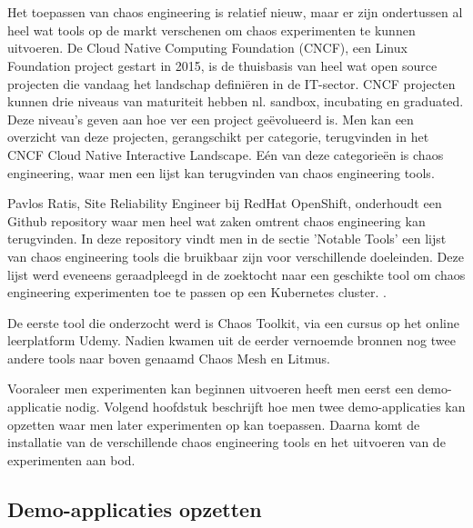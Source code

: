 
\chapter{}
\label{ch:chaostools}

Het toepassen van chaos engineering is relatief nieuw, maar er zijn ondertussen al heel wat tools op de markt verschenen om chaos experimenten te kunnen uitvoeren. De Cloud Native Computing Foundation (CNCF), een Linux Foundation project gestart in 2015, is de thuisbasis van heel wat open source projecten die vandaag het landschap definiëren in de IT-sector. CNCF projecten kunnen drie niveaus van maturiteit hebben nl. sandbox, incubating en graduated. Deze niveau's geven aan hoe ver een project geëvolueerd is. \autocite{CNCF2022a}
\newline Men kan een overzicht van deze projecten, gerangschikt per categorie, terugvinden in het CNCF Cloud Native Interactive Landscape. Eén van deze categorieën is chaos engineering, waar men  een lijst kan terugvinden van chaos engineering tools. \autocite{CloudNativeLandscape2022}

Pavlos Ratis, Site Reliability Engineer bij RedHat OpenShift, onderhoudt een Github repository  waar men heel wat zaken omtrent chaos engineering kan terugvinden. In deze repository vindt men in de sectie 'Notable Tools' een lijst van chaos engineering tools die bruikbaar zijn voor verschillende doeleinden. Deze lijst werd eveneens geraadpleegd in de zoektocht naar een geschikte tool om chaos engineering experimenten toe te passen op een Kubernetes cluster. \autocite{Ratis2022}.

De eerste tool die onderzocht werd is Chaos Toolkit, via een cursus op het online leerplatform Udemy. Nadien kwamen uit de eerder vernoemde bronnen nog twee andere tools naar boven genaamd Chaos Mesh en Litmus.

Vooraleer men experimenten kan beginnen uitvoeren heeft men eerst een demo-applicatie nodig. Volgend hoofdstuk beschrijft hoe men twee demo-applicaties kan opzetten waar men later experimenten op kan toepassen. Daarna komt de installatie van de verschillende chaos engineering tools en het uitvoeren van de experimenten aan bod.

\section{Demo-applicaties opzetten}

